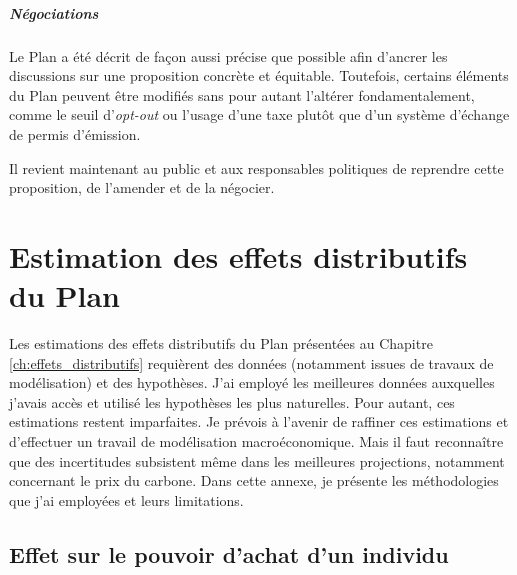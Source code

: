 \documentclass[a5paper,french,openany]{memoir}
\begin{document}
\paragraph{Négociations}

Le Plan a été décrit de façon aussi précise que possible afin d'ancrer les discussions sur une proposition concrète et équitable. Toutefois, certains éléments du Plan peuvent être modifiés sans pour autant l'altérer fondamentalement, comme le seuil d'\textit{opt-out} ou l'usage d'une taxe plutôt que d'un système d'échange de permis d'émission. 

Il revient maintenant au public et aux responsables politiques de reprendre cette proposition, de l'amender et de la négocier.


\chapter{Estimation des effets distributifs du Plan
}\label{ch:methodo}

Les estimations des effets distributifs du Plan présentées au Chapitre \ref{ch:effets_distributifs} requièrent des données (notamment issues de travaux de modélisation) et des hypothèses. 
J'ai employé les meilleures données auxquelles j'avais accès et utilisé les hypothèses les plus naturelles. Pour autant, ces estimations restent imparfaites. Je prévois à l'avenir de raffiner ces estimations et d'effectuer un travail de modélisation macroéconomique. Mais il faut reconnaître que des incertitudes subsistent même dans les meilleures projections, notamment concernant le prix du carbone. 
Dans cette annexe, je présente les méthodologies que j'ai employées et leurs limitations.

\section{Effet sur le pouvoir d'achat d'un individu}\label{app:indiv}
\end{document}
